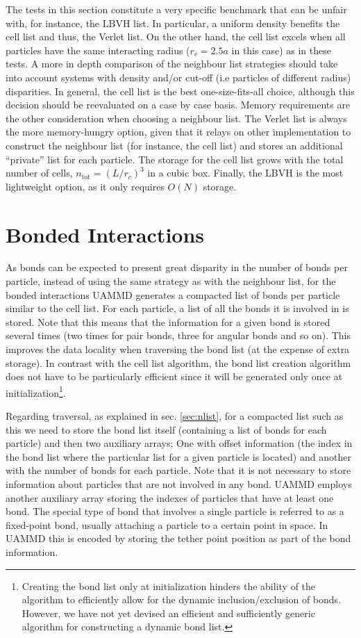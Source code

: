 \documentclass[ twoside,openright,titlepage,numbers=noenddot,%
headinclude,footinclude,cleardoublepage=empty,abstract=on,
BCOR=5mm,paper=b5,fontsize=11pt, dvipsnames
]{scrreprt}
\newcommand{\uammd}{\gls{UAMMD}\xspace}
\begin{document}
The tests in this section constitute a very specific benchmark that can be unfair with, for instance, the LBVH list. In particular, a uniform density benefits the cell list and thus, the Verlet list. On the other hand, the cell list excels when all particles have the same interacting radius ($r_c=2.5a$ in this case) as in these tests. A more in depth comparison of the neighbour list strategies should take into account systems with density and/or cut-off (i.e particles of different radius) disparities. In general, the cell list is the best one-size-fits-all choice, although this decision should be reevaluated on a case by case basis.
Memory requirements are the other consideration when choosing a neighbour list. The Verlet list is always the more memory-hungry option, given that it relays on other implementation to construct the neighbour list (for instance, the cell list) and stores an additional ``private'' list for each particle. The storage for the cell list grows with the total number of cells, $n_{\text{tot}}=(L/r_c)^3$ in a cubic box. Finally, the LBVH is the most lightweight option, as it only requires $O(N)$ storage.


\chapter{Bonded Interactions}\label{sec:bonded}

As bonds can be expected to present great disparity in the number of bonds per particle, instead of using the same strategy as with the neighbour list, for the bonded interactions \uammd generates a compacted list of bonds per particle similar to the cell list.
For each particle, a list of all the bonds it is involved in is stored. Note that this means that the information for a given bond is stored several times (two times for pair bonds, three for angular bonds and so on).
This improves the data locality when traversing the bond list (at the expense of extra storage).
In contrast with the cell list algorithm, the bond list creation algorithm does not have to be particularly efficient since it will be generated only once at initialization\footnote{Creating the bond list only at initialization hinders the ability of the algorithm to efficiently allow for the dynamic inclusion/exclusion of bonds. However, we have not yet devised an efficient and sufficiently generic algorithm for constructing a dynamic bond list.}.

Regarding traversal, as explained in sec. \ref{sec:nlist}, for a compacted list such as this we need to store the bond list itself (containing a list of bonds for each particle) and then two auxiliary arrays; One with offset information (the index in the bond list where the particular list for a given particle is located) and another with the number of bonds for each particle.
Note that it is not necessary to store information about particles that are not involved in any bond. UAMMD employs another auxiliary array storing the indexes of particles that have at least one bond.
The special type of bond that involves a single particle is referred to as a fixed-point bond, usually attaching a particle to a certain point in space. In UAMMD this is encoded by storing the tether point position as part of the bond information.
\end{document}
